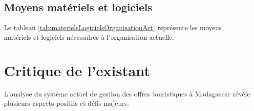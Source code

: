 \documentclass[12pt]{report}
\begin{document}
				\subsection{Moyens matériels et logiciels}
				\hspace{15pt} Le tableau \ref{tab:materielsLogicielsOrganisationAct} représente les moyens matériels et logiciels nécessaires à l'organisation actuelle.
				\begin{table}[h]
				  \centering
				  \caption{Moyens matériels et logiciels de l'organisation actuelle}
				  \label{tab:materielsLogicielsOrganisationAct}
				\end{table}
				\FloatBarrier				

				\section{Critique de l'existant}

				\hspace{15pt} L'analyse du système actuel de gestion des offres touristiques à Madagascar révèle plusieurs aspects positifs et défis majeurs.
				
\end{document}
